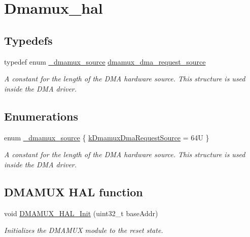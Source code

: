 \hypertarget{group__dmamux__hal}{}\section{Dmamux\+\_\+hal}
\label{group__dmamux__hal}
\subsection*{Typedefs}
\begin{DoxyCompactItemize}
\item 
typedef enum \hyperlink{group__dmamux__hal_gace5f1036af4e69333fb490b030de1112}{\+\_\+dmamux\+\_\+source} \hyperlink{group__dmamux__hal_ga5558bb8031c884b224394dce7c8d952c}{dmamux\+\_\+dma\+\_\+request\+\_\+source}\hypertarget{group__dmamux__hal_ga5558bb8031c884b224394dce7c8d952c}{}\label{group__dmamux__hal_ga5558bb8031c884b224394dce7c8d952c}

\begin{DoxyCompactList}\small\item\em A constant for the length of the D\+MA hardware source. This structure is used inside the D\+MA driver. \end{DoxyCompactList}\end{DoxyCompactItemize}
\subsection*{Enumerations}
\begin{DoxyCompactItemize}
\item 
enum \hyperlink{group__dmamux__hal_gace5f1036af4e69333fb490b030de1112}{\+\_\+dmamux\+\_\+source} \{ \hyperlink{group__dmamux__hal_ggace5f1036af4e69333fb490b030de1112a5424bc0aed5209b8d1c2bfe8783f87d1}{k\+Dmamux\+Dma\+Request\+Source} = 64U
 \}\begin{DoxyCompactList}\small\item\em A constant for the length of the D\+MA hardware source. This structure is used inside the D\+MA driver. \end{DoxyCompactList}
\end{DoxyCompactItemize}
\subsection*{D\+M\+A\+M\+UX H\+AL function}
\begin{DoxyCompactItemize}
\item 
void \hyperlink{group__dmamux__hal_gaf13fd496ce6068d1e81cf2b6a4261474}{D\+M\+A\+M\+U\+X\+\_\+\+H\+A\+L\+\_\+\+Init} (uint32\+\_\+t base\+Addr)
\begin{DoxyCompactList}\small\item\em Initializes the D\+M\+A\+M\+UX module to the reset state. \end{DoxyCompactList}\end{DoxyCompactItemize}


